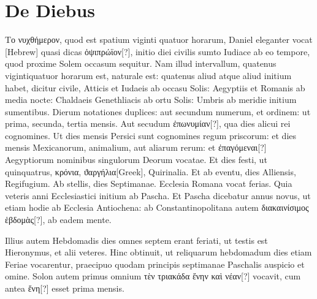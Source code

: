 \section{De Diebus}
\textgreek{Το νυχθήμερον},
quod est spatium viginti quatuor horarum, Daniel
eleganter vocat \texthebrew{[Hebrew]} quasi dicas
 \textgreek{ὀψιπρώϊον[?]}, initio diei civilis
sumto Iudiace ab eo tempore, quod proxime Solem occasum
sequitur.
Nam illud intervallum, quatenus vigintiquatuor horarum est,
naturale est: quatenus aliud atque aliud initium habet, dicitur civile,
Atticis et Iudaeis ab occasu Solis: Aegyptiis et Romanis ab media nocte:
Chaldaeis Genethliacis ab ortu Solis: Umbris ab meridie initium
sumentibus.
Dierum notationes duplices: aut secundum numerum, et
ordinem: ut prima, secunda, tertia mensis.
Aut secudum \textgreek{ἐπωνυμίαν[?]},
qua dies alicui rei cognomines.
Ut dies mensis Persici sunt cognomines
regum priscorum: et dies mensis Mexicanorum, animalium, aut aliarum
rerum: et \textgreek{ἐπαγόμεναι[?]} Aegyptiorum nominibus singulorum Deorum
vocatae.
Et dies festi, ut quinquatrus, \textgreek{κρόνια},
\textgreek{ϑαργήλια[Greek]}, Quirinalia.
Et ab eventu, dies Alliensis, Regifugium.
Ab stellis, dies Septimanae.
Ecclesia Romana vocat ferias.
Quia veteris anni Ecclesiastici initium
ab Pascha.
Et Pascha dicebatur annus novus, ut etiam hodie ab Ecclesia
Antiochena: ab Constantinopolitana autem \textgreek{διακαινίσιμος ἑβδομὰς[?]},
ab eadem mente.
\begin{table}[tbp]
  
\end{table}
Illius autem Hebdomadis dies omnes septem erant
feriati, ut testis est Hieronymus, et alii veteres.
Hinc obtinuit, ut reliquarum
hebdomadum dies etiam Feriae vocarentur, praecipuo quodam
principis septimanae Paschalis auspicio et omine.
Solon autem
primus omnium \textgreek{τὲν τριακάδα ἔνην καὶ νέαν[?]} vocavit,
 cum antea \textgreek{ἔνη[?]} esset
prima mensis.
